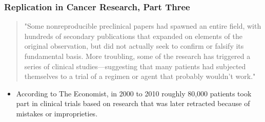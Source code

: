 \documentclass[10pt, block=fill]{beamer}
\begin{document}
\begin{frame}
    \frametitle{Replication in Cancer Research, Part Three}
    \begin{quote}
         "Some nonreproducible preclinical papers had spawned an entire field, with hundreds of secondary publications that expanded on elements of the original observation, but did not actually seek to confirm or falsify its fundamental basis. More troubling, some of the research has triggered a series of clinical studies—suggesting that many patients had subjected themselves to a trial of a regimen or agent that probably wouldn't work."
    \end{quote}
    \begin{itemize}
      \item According to The Economist, in 2000 to 2010 roughly 80,000 patients took part in clinical trials based on research that was later retracted because of mistakes or improprieties.
  \end{itemize}
  
\end{frame}
\end{document}
